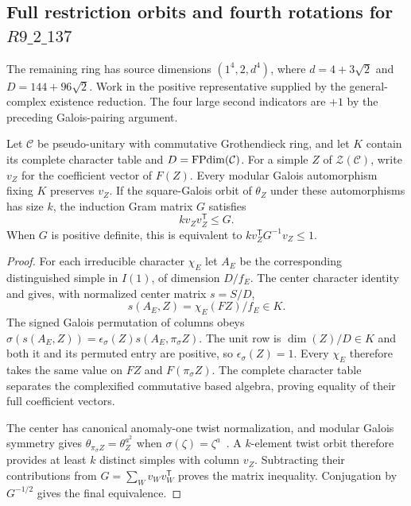\subsection{Full restriction orbits and fourth rotations for $R9\_2\_137$}
\label{sec:r137-restrictions}
The remaining ring has source dimensions $(1^4,2,d^4)$, where
$d=4+3\sqrt2$ and $D=144+96\sqrt2$. Work in the positive representative
supplied by the general-complex existence reduction. The four large
second indicators are $+1$ by the preceding Galois-pairing argument.

\begin{lemma}
Let $\mathcal C$ be pseudo-unitary with commutative Grothendieck ring,
and let $K$ contain its complete character table and
$D=\operatorname{FPdim}(\mathcal C)$. For a simple $Z$ of $\mathcal Z(\mathcal C)$,
write $v_Z$ for the coefficient vector of $F(Z)$. Every modular Galois
automorphism fixing $K$ preserves $v_Z$.
If the square-Galois orbit of $\theta_Z$ under these automorphisms has
size $k$, the induction Gram matrix $G$ satisfies
\[
 k v_Zv_Z^{\mathsf T}\le G.
\]
When $G$ is positive definite, this is equivalent to
$k v_Z^{\mathsf T}G^{-1}v_Z\le1$.
\end{lemma}
\begin{proof}
For each irreducible character $\chi_E$ let $A_E$ be the corresponding
distinguished simple in $I(1)$, of dimension $D/f_E$. The center character
identity~\cite[Proposition 2.8 and Corollary 4.5]{Deshpande} and
\cite[Theorem 2.13]{Ostrik} gives, with normalized center matrix $s=S/D$,
\[
 s(A_E,Z)=\chi_E(FZ)/f_E\in K.
\]
The signed Galois permutation of columns obeys
$\sigma(s(A_E,Z))=\epsilon_\sigma(Z)s(A_E,\pi_\sigma Z)$.
The unit row is $\dim(Z)/D\in K$ and both it and its permuted entry are
positive, so $\epsilon_\sigma(Z)=1$. Every $\chi_E$ therefore takes the
same value on $FZ$ and $F(\pi_\sigma Z)$. The complete character table
separates the complexified commutative based algebra, proving equality
of their full coefficient vectors.

The center has canonical anomaly-one twist normalization, and modular
Galois symmetry gives $\theta_{\pi_\sigma Z}=\theta_Z^{a^2}$ when
$\sigma(\zeta)=\zeta^a$~\cite[Lemma 4.2]{DLN}. A $k$-element twist orbit
therefore provides at least $k$ distinct simples with column $v_Z$.
Subtracting their contributions from $G=\sum_Wv_Wv_W^{\mathsf T}$
proves the matrix inequality. Conjugation by $G^{-1/2}$ gives the final
equivalence.
\end{proof}

